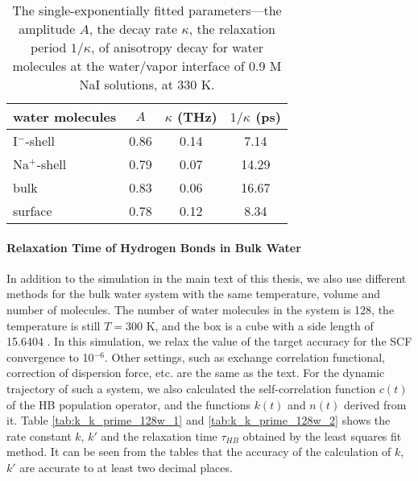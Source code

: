 \begin{table}[H]
\centering
\caption{\label{tab:c2_single-exp-fitting_NaI}%
	The single-exponentially fitted parameters---the amplitude $A$, the decay rate $\kappa$, the relaxation period $1/\kappa$, of anisotropy decay for water molecules 
	at the water/vapor interface of 0.9 M NaI solutions, at 330 K.} 
\begin{tabular}{lccc}
	water molecules &  $A$ & $\kappa$ (THz) & $1/\kappa$ (ps)  \\
\hline
	I$^-$-shell  & 0.86  & 0.14  & 7.14 \\
	Na$^+$-shell & 0.79 & 0.07  & 14.29 \\
	bulk & 0.83 & 0.06  & 16.67 \\
	surface & 0.78 & 0.12 & 8.34 \\
\end{tabular}
\end{table}

\paragraph{Relaxation Time of Hydrogen Bonds in Bulk Water}\label{rate_const_and_tau_R_128w}
% 
In addition to the simulation in the main text of this thesis, we also use different methods for the bulk water system with the same temperature,
volume and number of molecules. The number of water molecules in the system is 128, the temperature is still $T=300$ K, and the box is a cube with a side length of 15.6404 \A. 
In this simulation, we relax the value of the target accuracy for the SCF convergence to 10$^{-6}$. 
Other settings, such as exchange correlation functional, correction of dispersion force, etc. are the same as the text. 
For the dynamic trajectory of such a system, we also calculated the self-correlation function $c(t)$ of the HB population operator, 
and the functions $k(t)$ and $n(t)$ derived from it. 
Table \ref{tab:k_k_prime_128w_1} and \ref{tab:k_k_prime_128w_2} shows the rate constant $k$, $k'$ and 
the relaxation time $\tau_{HB}$ obtained by the least squares fit method. 
It can be seen from the tables that the accuracy of the calculation of $k$, $k'$ are accurate to at least two decimal places.

